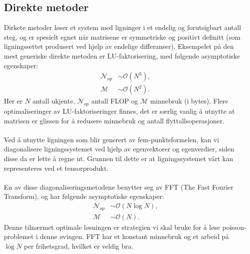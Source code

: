 \documentclass{article}
\begin{document}
\subsection{Direkte metoder}
Dirkete metoder løser et system med ligninger i et endelig og forutsigbart antall steg, og er spesielt egnet når matrisene er symmetriske og positivt definitt (som ligningssettet produsert ved hjelp av endelige differanser). Eksempelet på den mest generiske direkte metoden er LU-faktorisering, med følgende asymptotiske egenskaper:
\begin{align*}
      \mathcal{N}_{op} &\sim \mathcal{O}(N^3), \\
      \mathcal{M} &\sim \mathcal{O}(N^2).
\end{align*}
Her er $N$ antall ukjente,  $\mathcal{N}_{op}$ antall FLOP og $\mathcal{M}$ minnebruk (i bytes). Flere optimaliseringer av LU-faktoriseringer finnes, det er særlig vanlig å utnytte at matrisen er glissen for å redusere minnebruk og antall flyttallsoperasjoner. \\
\\
Ved å utnytte ligningen som blir generert av fem-punktsformelen, kan vi diagonalisere ligningssystemet ved hjelp av egenvektorer og egenverdier, siden disse da er lette å regne ut. Grunnen til dette er at ligningssystemet vårt kan representeres ved et tensorprodukt.\\
\\
En av disse diagonaliseringsmetodene benytter seg av FFT (The Fast Fourier Transform), og har følgende asymptotiske egenskaper:
\begin{align*}
  \mathcal{N}_{op} &\sim \mathcal{O}(N \log N), \\
  \mathcal{M} &\sim \mathcal{O}(N).
\end{align*}
Denne tilnærmet optimale løsningen er strategien vi skal bruke for å løse poisson-problemet i denne øvingen. FFT har et konstant minnebruk og et arbeid på $\log N$ per frihetsgrad, hvilket er veldig bra.
\end{document}
